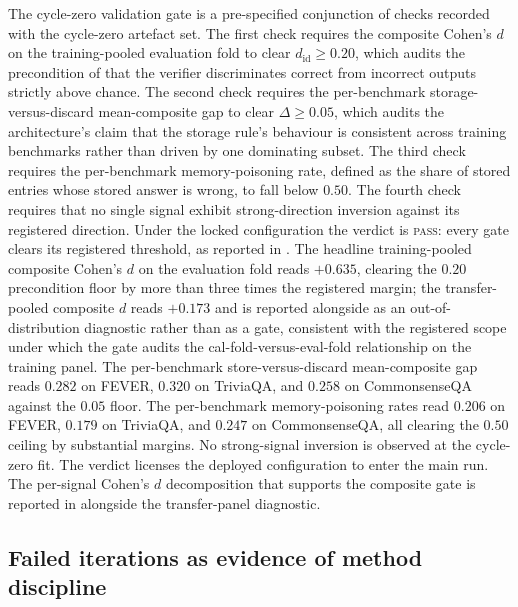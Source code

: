 The cycle-zero validation gate is a pre-specified conjunction of checks recorded with the cycle-zero artefact set. The first check requires the composite Cohen's $d$ on the training-pooled evaluation fold to clear $d_{\text{id}} \ge 0.20$, which audits the precondition of  that the verifier discriminates correct from incorrect outputs strictly above chance. The second check requires the per-benchmark storage-versus-discard mean-composite gap to clear $\Delta \ge 0.05$, which audits the architecture's claim that the storage rule's behaviour is consistent across training benchmarks rather than driven by one dominating subset. The third check requires the per-benchmark memory-poisoning rate, defined as the share of stored entries whose stored answer is wrong, to fall below $0.50$. The fourth check requires that no single signal exhibit strong-direction inversion against its registered direction. Under the locked configuration the verdict is \textsc{pass}: every gate clears its registered threshold, as reported in . The headline training-pooled composite Cohen's $d$ on the evaluation fold reads $+0.635$, clearing the $0.20$ precondition floor by more than three times the registered margin; the transfer-pooled composite $d$ reads $+0.173$ and is reported alongside as an out-of-distribution diagnostic rather than as a gate, consistent with the registered scope under which the gate audits the cal-fold-versus-eval-fold relationship on the training panel. The per-benchmark store-versus-discard mean-composite gap reads $0.282$ on FEVER, $0.320$ on TriviaQA, and $0.258$ on CommonsenseQA against the $0.05$ floor. The per-benchmark memory-poisoning rates read $0.206$ on FEVER, $0.179$ on TriviaQA, and $0.247$ on CommonsenseQA, all clearing the $0.50$ ceiling by substantial margins. No strong-signal inversion is observed at the cycle-zero fit. The verdict licenses the deployed configuration to enter the main run. The per-signal Cohen's $d$ decomposition that supports the composite gate is reported in  alongside the transfer-panel diagnostic.





\FloatBarrier

\subsection{Failed iterations as evidence of method discipline}
\label{sec:adj-failed-iterations}

